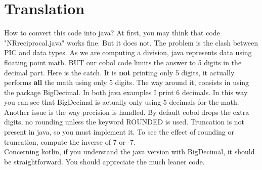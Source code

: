 \documentclass[letter,12pt]{article}
\begin{document}
\section{Translation}
How to convert this code into java? At first, you may think that code "NRreciprocal.java" works fine. But it does not. 
The problem is the clash between PIC and data types. As we are computing a division, java represents data using floating point math. 
BUT our cobol code limits the answer to 5 digits in the decimal part. Here is the catch. It is \textbf{not} printing only 5 digits, 
it actually performs \textbf{all} the math using only 5 digits. The way around it, consists in using the package BigDecimal. 
In both java examples I print 6 decimals. In  this way you can see that BigDecimal is actually only using 5 decimals for the math.\\
Another issue is the way precision is handled. By default cobol drops the extra digits, no rounding unless the keyword ROUNDED is used.
Truncation is  not present in java, so you must implement it. To see the effect of rounding or truncation, compute the inverse of 7 or -7.\\
Concerning kotlin, if you understand the java version with BigDecimal, it should be straightforward. You should appreciate the much leaner code.
\end{document}
